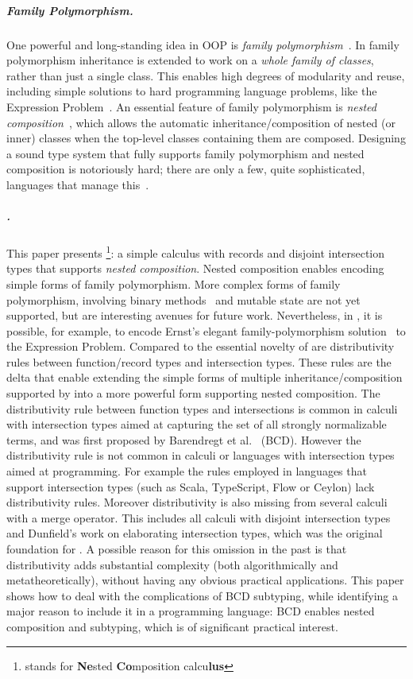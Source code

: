 \subparagraph{Family Polymorphism.}
One powerful and long-standing idea in OOP is \emph{family
  polymorphism}~\cite{Ernst_2001}. In family polymorphism inheritance is
extended to work on a \emph{whole family of classes}, rather than just a single
class. This enables high degrees of modularity and
reuse, including simple solutions to hard programming language problems, like
the Expression Problem~\cite{wadler1998expression}. An essential feature of
family polymorphism is \emph{nested composition}~\cite{Corradi_2012,
  ErnstVirtual, Nystrom_2004}, which allows the automatic
inheritance/composition of nested (or inner) classes when the top-level classes
containing them are composed. Designing a sound type system that fully supports family
polymorphism and nested composition is notoriously hard; there are only
a few, quite sophisticated, languages that manage this~\cite{ErnstVirtual, Nystrom_2004, pubsdoc:tribe-virtual-calculus, SAITO_2007}.

\subparagraph{\name.}
This paper presents \name\footnote{\name stands for \textbf{Ne}sted \textbf{Co}mposition calcu\textbf{lus}}: a simple calculus with records and
disjoint intersection types that supports \emph{nested composition}. Nested composition enables
encoding simple forms of family polymorphism. More complex forms of
family polymorphism, involving binary methods~\cite{bruce1995binary} and mutable state are
not yet supported, but are interesting avenues for future work.
Nevertheless, in \name, it is
possible, for example, to encode Ernst's elegant family-polymorphism solution~\cite{Ernst_2001} to
the Expression Problem. 
Compared to \oname the essential novelty of \name are
distributivity rules between function/record types and intersection
types. These rules are the delta that enable extending the simple
forms of multiple inheritance/composition supported by \oname into a
more powerful form supporting nested composition. The distributivity
rule between function types and intersections is
common in calculi with intersection types aimed at capturing the set
of all strongly normalizable terms, and was first proposed by
Barendregt et al.~\cite{Barendregt_1983} (BCD). However the
distributivity rule is not common in calculi or languages with intersection types
aimed at programming. For example the rules employed in languages that
support intersection types (such as Scala, TypeScript, Flow or Ceylon)
lack distributivity rules. Moreover distributivity is also missing from
several calculi with a merge operator. This includes all calculi with
disjoint intersection types and Dunfield's work on elaborating
intersection types, which was the original foundation for \oname.
A possible reason for this omission in the past is that distributivity adds
substantial complexity (both algorithmically and metatheoretically), without having any obvious practical
applications. 
This paper shows how to deal with the complications of BCD subtyping, while
identifying a major reason to include it in a programming
language: BCD enables nested composition and subtyping, which is of
significant practical interest.

